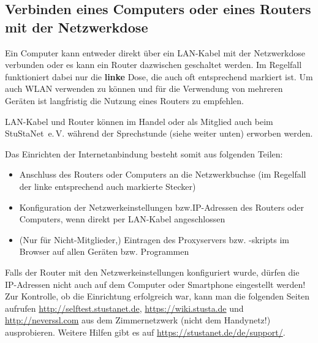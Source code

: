\documentclass[a4paper,12pt]{scrartcl}
\makeatletter
\newcommand{\StuStaNet}{StuStaNet~e.\,V.\@}
\makeatother
\begin{document}
\subsection{Verbinden eines Computers oder eines Routers mit der Netzwerkdose}
Ein Computer kann entweder direkt über ein LAN-Kabel mit der Netzwerkdose verbunden oder es kann ein Router dazwischen geschaltet werden.
Im Regelfall funktioniert dabei nur die \textbf{linke} Dose, die auch oft entsprechend markiert ist. 
Um auch WLAN verwenden zu können und für die Verwendung von mehreren Geräten ist langfristig die Nutzung eines Routers zu empfehlen.

LAN-Kabel und Router können im Handel oder als Mitglied auch beim \StuStaNet{} während der Sprechstunde (siehe weiter unten) erworben werden.

Das Einrichten der Internetanbindung besteht somit aus folgenden Teilen:
\begin{itemize}
	\item Anschluss des Routers oder Computers an die Netzwerkbuchse (im Regelfall der linke entsprechend auch markierte Stecker)
	\item Konfiguration der Netzwerkeinstellungen bzw.\@ IP-Adressen des Routers oder Computers, wenn direkt per LAN-Kabel angeschlossen
	\item (Nur für Nicht-Mitglieder,) Eintragen des Proxyservers bzw. -skripts im Browser auf allen Geräten bzw. Programmen
\end{itemize}
Falls der Router mit den Netzwerkeinstellungen konfiguriert wurde, dürfen die IP-Adressen nicht auch auf dem Computer oder Smartphone eingestellt werden!
Zur Kontrolle, ob die Einrichtung erfolgreich war, kann man die folgenden Seiten aufrufen \mbox{\url{http://selftest.stustanet.de}}, \mbox{\url{https://wiki.stusta.de}} und \mbox{\url{http://neverssl.com}} aus dem Zimmernetzwerk (nicht dem Handynetz!) ausprobieren.
Weitere Hilfen gibt es auf \mbox{\url{https://stustanet.de/de/support/}}.
\end{document}
